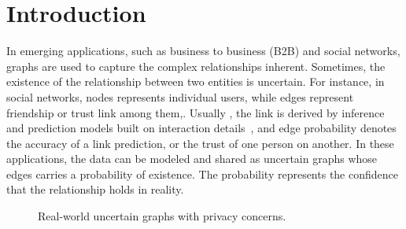 \section{Introduction}

\label{sec:Intro}

In emerging applications, such as business to business (B2B) and social networks,  graphs are used to capture the complex relationships inherent. Sometimes, the existence of the relationship between two entities is uncertain. For instance, in social networks, nodes represents individual users, while edges represent friendship or trust link among them,.  Usually , the link is derived by inference and prediction models built on interaction details~\cite{Lin_B2B,Adar_Managing_2007,Kempe_Maximizing_2003}, and edge probability denotes the accuracy of a link prediction, or the trust of one person on another. 
In these applications, the data can be modeled and shared as uncertain graphs whose edges carries a probability of existence. The probability represents the confidence that the relationship holds in reality. 

\begin{figure}[!htb]
  \vspace{-7pt}
    \vspace{-7pt}
    \caption{Real-world uncertain graphs with privacy concerns.}
    \label{fig:motivation}
    \vspace{-7pt}
\end{figure} 

